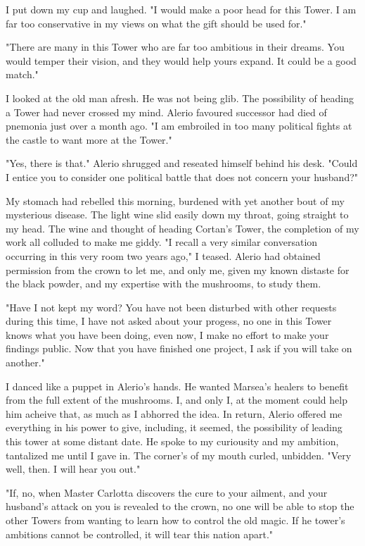\documentclass{article}
\begin{document}
I put down my cup and laughed. "I would make a poor head for this Tower. I am far too conservative in my views on what the gift should be used for."

"There are many in this Tower who are far too ambitious in their dreams. You would temper their vision, and they would help yours expand. It could be a good match."

I looked at the old man afresh. He was not being glib. The possibility of heading a Tower had never crossed my mind. Alerio favoured successor had died of pnemonia just over a month ago. "I am embroiled in too many political fights at the castle to want more at the Tower."

"Yes, there is that." Alerio shrugged and reseated himself behind his desk. "Could I entice you to consider one political battle that does not concern your husband?"

My stomach had rebelled this morning, burdened with yet another bout of my mysterious disease. The light wine slid easily down my throat, going straight to my head. The wine and thought of heading Cortan's Tower, the completion of my work all colluded to make me giddy. "I recall a very similar conversation occurring in this very room two years ago," I teased. Alerio had obtained permission from the crown to let me, and only me, given my known distaste for the black powder, and my expertise with the mushrooms, to study them.

"Have I not kept my word? You have not been disturbed with other requests during this time, I have not asked about your progess, no one in this Tower knows what you have been doing, even now, I make no effort to make your findings public. Now that you have finished one project, I ask if you will take on another."

I danced like a puppet in Alerio's hands. He wanted Marsea's healers to benefit from the full extent of the mushrooms. I, and only I, at the moment could help him acheive that, as much as I abhorred the idea. In return, Alerio offered me everything in his power to give, including, it seemed, the possibility of leading this tower at some distant date. He spoke to my curiousity and my ambition, tantalized me until I gave in. The corner's of my mouth curled, unbidden. "Very well, then. I will hear you out."

"If, no, when Master Carlotta discovers the cure to your ailment, and your husband's attack on you is revealed to the crown, no one will be able to stop the other Towers from wanting to learn how to control the old magic. If he tower's ambitions cannot be controlled, it will tear this nation apart."
\end{document}
